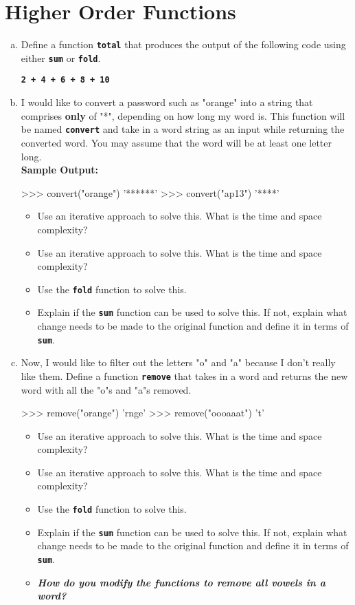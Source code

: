 \newpage

\section{Higher Order Functions}
\begin{enumerate}[(a)]
\item Define a function \texttt{\bfseries total} that produces the output of the following code using either
\texttt{\bfseries sum} or \texttt{\bfseries fold}.
\begin{center}
\texttt{\bfseries 2 + 4 + 6 + 8 + 10}
\end{center}

\item I would like to convert a password such as "orange" into a string that comprises \textbf{only} of
"*", depending on how long my word is. This function will be named \texttt{\bfseries convert} and
take in a word string as an input while returning the converted word. You may assume
that the word will be at least one letter long. \\
\textbf{Sample Output:}
\begin{python}
>>> convert("orange")
'******'
>>> convert("ap13")
'****'
\end{python}
\begin{itemize}
\item Use an iterative approach to solve this. What is the time and space complexity?
\item Use an iterative approach to solve this. What is the time and space complexity?
\item Use the \texttt{\bfseries fold} function to solve this.
\item Explain if the \texttt{\bfseries sum} function can be used to solve this. If not, explain what change needs
to be made to the original function and define it in terms of \texttt{\bfseries sum}.
\end{itemize}

\item Now, I would like to filter out the letters "o" and "a" because I don't really like them. Define a
function \texttt{\bfseries remove} that takes in a word and returns the new word with all the "o"s and "a"s
removed.
\begin{python}
>>> remove("orange")
'rnge'
>>> remove("oooaaat")
't'
\end{python}
\begin{itemize}
\item Use an iterative approach to solve this. What is the time and space complexity?
\item Use an iterative approach to solve this. What is the time and space complexity?
\item Use the \texttt{\bfseries fold} function to solve this.
\item Explain if the \texttt{\bfseries sum} function can be used to solve this. If not, explain what change needs
to be made to the original function and define it in terms of \texttt{\bfseries sum}.
\item \textbf{\textit{How do you modify the functions to remove all vowels in a word?}}
\end{itemize}
\end{enumerate}

